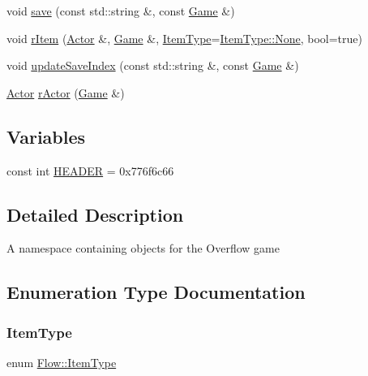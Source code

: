 \begin{DoxyCompactItemize}
\item 
void \hyperlink{namespace_flow_afcb05b356ff6fd256778082a2b9a4f3f}{save} (const std\+::string \&, const \hyperlink{class_flow_1_1_game}{Game} \&)
\item 
void \hyperlink{namespace_flow_a26033855ea2a0a990eeebb4904d89a3f}{r\+Item} (\hyperlink{class_flow_1_1_actor}{Actor} \&, \hyperlink{class_flow_1_1_game}{Game} \&, \hyperlink{namespace_flow_a09368c0b65b3d1bc5c227ed1046c8bca}{Item\+Type}=\hyperlink{namespace_flow_a09368c0b65b3d1bc5c227ed1046c8bcaa6adf97f83acf6453d4a6a4b1070f3754}{Item\+Type\+::\+None}, bool=true)
\item 
void \hyperlink{namespace_flow_a0cd8a32e71f1630075020041656000ac}{update\+Save\+Index} (const std\+::string \&, const \hyperlink{class_flow_1_1_game}{Game} \&)
\item 
\hyperlink{class_flow_1_1_actor}{Actor} \hyperlink{namespace_flow_ad2921d35a512b47f3d231ae37f730e61}{r\+Actor} (\hyperlink{class_flow_1_1_game}{Game} \&)
\end{DoxyCompactItemize}
\subsection*{Variables}
\begin{DoxyCompactItemize}
\item 
const int \hyperlink{namespace_flow_a67f232b0dafe43785c035732008ae778}{H\+E\+A\+D\+ER} = 0x776f6c66
\end{DoxyCompactItemize}


\subsection{Detailed Description}
A namespace containing objects for the Overflow game 

\subsection{Enumeration Type Documentation}
\hypertarget{namespace_flow_a09368c0b65b3d1bc5c227ed1046c8bca}{}\label{namespace_flow_a09368c0b65b3d1bc5c227ed1046c8bca} 
\subsubsection{\texorpdfstring{Item\+Type}{ItemType}}
{\footnotesize\ttfamily enum \hyperlink{namespace_flow_a09368c0b65b3d1bc5c227ed1046c8bca}{Flow\+::\+Item\+Type}\hspace{0.3cm}{\ttfamily [strong]}}

